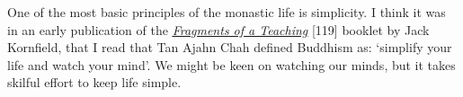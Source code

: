 One of the most basic principles of the monastic life is simplicity. I
think it was in an early publication of the
\href{https://forestsangha.org/teachings/books/the-collected-teachings-of-ajahn-chah-single-volume?language=English}{\emph{\underline{Fragments
of a Teaching}}} {[}119{]} booklet by Jack Kornfield, that I read that
Tan Ajahn Chah defined Buddhism as: `simplify your life and watch your
mind'. We might be keen on watching our minds, but it takes skilful
effort to keep life simple.

